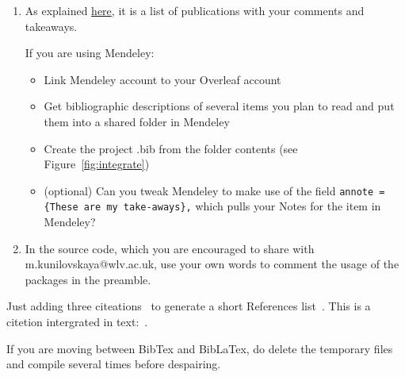 \documentclass[a4paper,11pt]{article}
\begin{document}
\begin{tcolorbox}[width=\textwidth, colback={yellow!40!white}, title={Create an annotated bibliography and revise imported packages}, colbacktitle=yellow!60!white, coltitle=black]
	\begin{enumerate}
		\item As explained \href{https://www.wlv.ac.uk/lib/media/departments/lis/skills/study-guides/LS136-Guide-to-Writing-an-Annotated-Bibliography.pdf}{here}, it is a list of publications with your comments and takeaways.
		
			If you are using Mendeley:
			\begin{itemize}
				\item Link Mendeley account to your Overleaf account
				\item Get bibliographic descriptions of several items you plan to read and put them into a shared folder in Mendeley
				\item Create the project .bib from the folder contents (see Figure~\ref{fig:integrate})
				\item (optional) Can you tweak Mendeley to make use of the field \verb|annote = {These are my take-aways},| which pulls your Notes for the item in Mendeley?
			\end{itemize}
		\item In the source code, which you are encouraged to share with m.kunilovskaya@wlv.ac.uk, use your own words to comment the usage of the packages in the preamble.
	\end{enumerate}
	
\end{tcolorbox}%

Just adding three citeations~\citep{Scarton2018} to generate a short References list~\cite[p.~215]{Tani2022}. This is a citetion intergrated in text:~\citet{Alva-Manchego2021}. 

\bigskip

If you are moving between BibTex and BibLaTex, do delete the temporary files and compile several times before despairing. 







\end{document}
